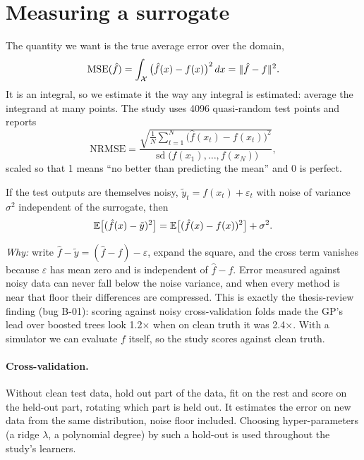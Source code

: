 \section{Measuring a surrogate}
\label{sec:measure}

The quantity we want is the true average error over the domain,
\begin{equation}
  \text{MSE}(\hat f) = \int_{\mathcal{X}} \big(\hat f(x) - f(x)\big)^2\, dx = \lVert \hat f - f\rVert^2 .
\end{equation}
It is an integral, so we estimate it the way any integral is estimated: average the integrand at many points. The
study uses 4096 quasi-random test points and reports
\begin{equation}
  \text{NRMSE} = \frac{\sqrt{\tfrac{1}{N}\sum_{t=1}^N \big(\hat f(x_t) - f(x_t)\big)^2}}{\operatorname{sd}\big(f(x_1),
  \dots, f(x_N)\big)} ,
\end{equation}
scaled so that 1 means ``no better than predicting the mean'' and 0 is perfect.

\begin{result}
If the test outputs are themselves noisy, $\tilde y_t = f(x_t) + \varepsilon_t$ with noise of variance $\sigma^2$
independent of the surrogate, then
\begin{equation}
  \mathbb{E}\big[(\hat f(x) - \tilde y)^2\big] = \mathbb{E}\big[(\hat f(x) - f(x))^2\big] + \sigma^2 .
\end{equation}
\end{result}
\emph{Why:} write $\hat f - \tilde y = (\hat f - f) - \varepsilon$, expand the square, and the cross term vanishes
because $\varepsilon$ has mean zero and is independent of $\hat f - f$. Error measured against noisy data can never
fall below the noise variance, and when every method is near that floor their differences are compressed. This is
exactly the thesis-review finding (bug B-01): scoring against noisy cross-validation folds made the GP's lead over
boosted trees look 1.2$\times$ when on clean truth it was 2.4$\times$. With a simulator we can evaluate $f$ itself, so
the study scores against clean truth.

\paragraph{Cross-validation.} Without clean test data, hold out part of the data, fit on the rest and score on the
held-out part, rotating which part is held out. It estimates the error on new data from the same distribution, noise
floor included. Choosing hyper-parameters (a ridge $\lambda$, a polynomial degree) by such a hold-out is used
throughout the study's learners.


